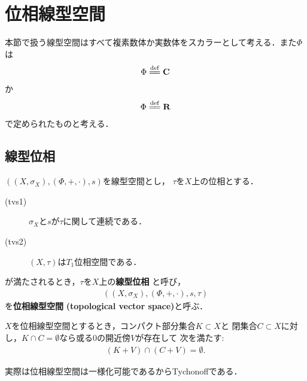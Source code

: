 \section{位相線型空間}
	本節で扱う線型空間はすべて複素数体か実数体をスカラーとして考える．また$\Phi$は
	\begin{align}
		\Phi \defeq \C
	\end{align}
	か
	\begin{align}
		\Phi \defeq \R
	\end{align}
	で定められたものと考える．
	
\subsection{線型位相}
	\begin{screen}
		\begin{dfn}[位相線型空間]\label{def:topological_vector_space}
			$\left((X,\sigma_X),(\Phi,+,\cdot),s\right)$を線型空間とし，
			$\tau$を$X$上の位相とする．
			\begin{description}
				\item[(tvs1)] $\sigma_X$と$s$が$\tau$に関して連続である．
				\item[(tvs2)] $(X,\tau)$は$T_1$位相空間である．
			\end{description}
			が満たされるとき，$\tau$を$X$上の{\bf 線型位相}
			と呼び，
			\begin{align}
				\left((X,\sigma_X),(\Phi,+,\cdot),s,\tau\right)
			\end{align}
			を{\bf 位相線型空間}
			{\bf (topological vector space)}と呼ぶ．
		\end{dfn}
	\end{screen}
	
	\begin{screen}
		\begin{thm}[位相線型空間は$T_3$]\label{thm:tvs_T_3_space}
			$X$を位相線型空間とするとき，コンパクト部分集合$K \subset X$と
			閉集合$C \subset X$に対し，$K \cap C = \emptyset$なら或る0の開近傍$V$が存在して
			次を満たす:
			\begin{align}
				(K + V) \cap (C + V) = \emptyset.
				\label{eq:thm_tvs_T_3_space}
			\end{align}
		\end{thm}
	\end{screen}
	
	実際は位相線型空間は一様化可能であるからTychonoffである．
	
